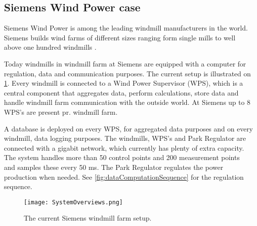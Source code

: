 \subsection{Siemens Wind Power case}
\label{sec:SiemensCase}
Siemens Wind Power is among the leading windmill manufacturers in the world. Siemens builds wind farms of different sizes ranging form single mills to well above one hundred windmills \cite{simensOffShoreProjects, simensOnShoreProjects}.

Today windmills in windmill farm at Siemens are equipped with a computer for regulation, data and communication purposes. The current setup is illustrated on \cref{fig:currentSiemensSetup}. Every windmill is connected to a Wind Power Supervisor (WPS), which is a central component that aggregates data, perform calculations, store data and handle windmill farm communication with the outside world. At Siemens up to 8 WPS's are present pr. windmill farm.

A database is deployed on every WPS, for aggregated data purposes and on every windmill, data logging purposes. The windmills, WPS's and Park Regulator are connected with a gigabit network, which currently has plenty of extra capacity. The system handles more than 50 control points and 200 measurement points and samples these every 50 ms. The Park Regulator regulates the power production when needed. See \cref{fig:dataComputationSequence} for the regulation sequence.

\begin{figure}
	\centering
	\texttt{[image: SystemOverviews.png]} 
	\caption[Illustrates the current Siemens windmill farm setup]{
		\label{fig:currentSiemensSetup} 
		\footnotesize{%
			The current Siemens windmill farm setup.
		}
	}
\end{figure}


